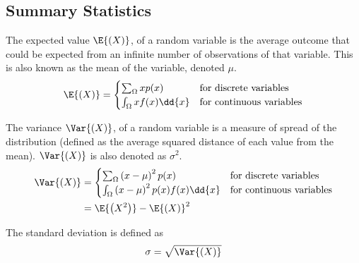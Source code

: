 \documentclass{article}
\begin{document}
\subsection{Summary Statistics}
\begin{definition}[Expectation]
    The expected value \(\E{\left( X \right)}\), of a random variable is the average
    outcome that could be expected from an infinite number of observations of that
    variable. This is also known as the mean of the variable, denoted \(\mu \).
    \begin{equation*}
        \E{\left( X \right)} =
        \begin{cases}
            \sum_{\Omega} x p(x)        & \text{for discrete variables}   \\
            \int_{\Omega} x f(x) \dd{x} & \text{for continuous variables}
        \end{cases}
    \end{equation*}
\end{definition}
\begin{definition}[Variance]
    The variance \(\Var{\left( X \right)}\), of a random variable is a measure of spread
    of the distribution (defined as the average squared distance of each value from the mean).
    \(\Var{\left( X \right)}\) is also denoted as \(\sigma^2\).
    \begin{align*}
        \Var{\left( X \right)} & =
        \begin{cases}
            \sum_{\Omega} \left( x - \mu \right)^2 p(x)             & \text{for discrete variables}   \\
            \int_{\Omega} \left( x - \mu \right)^2 p(x) f(x) \dd{x} & \text{for continuous variables}
        \end{cases} \\
                               & = \E{\left( X^2 \right)} - \E{\left( X \right)}^2
    \end{align*}
\end{definition}
\begin{definition}
    The standard deviation is defined as
    \begin{equation*}
        \sigma = \sqrt{\Var{\left( X \right)}}
    \end{equation*}
\end{definition}
\end{document}
